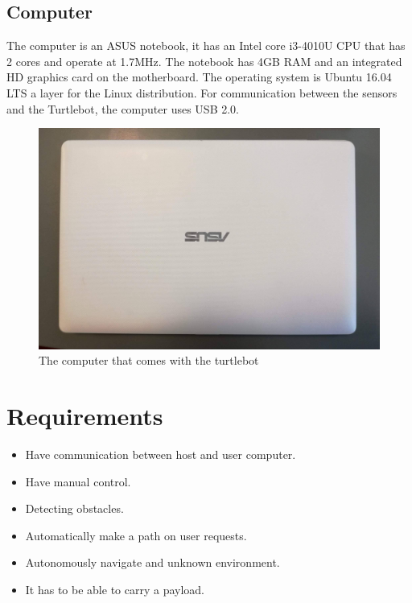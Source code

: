 \subsection{Computer} 
The computer is an ASUS notebook, it has an Intel core i3-4010U CPU that has 2 cores and operate at 1.7MHz\cite{CPU}. The notebook has 4GB RAM and an integrated HD graphics card on the motherboard\cite{ASUS}.
The operating system is Ubuntu 16.04 LTS a layer for the Linux distribution. For communication between the sensors and the Turtlebot, the computer uses USB 2.0.
\begin{figure}[h]
   \centering
    \includegraphics[width=.6\textwidth]{figures/ASUS.jpg}
    \caption{The computer that comes with the turtlebot}
    \label{fig:ASUS}
\end{figure}

\section{Requirements}

\begin{itemize}
    \item Have communication between host and user computer. 
    \item Have manual control.
    \item Detecting obstacles.
    \item Automatically make a path on user requests.
    \item Autonomously navigate and unknown environment.
    \item It has to be able to carry a payload.
\end{itemize}